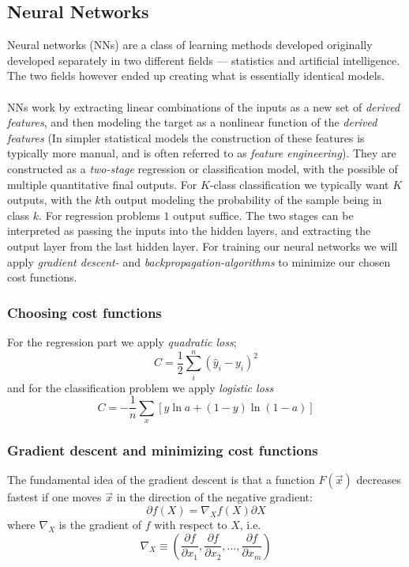 \documentclass[10pt, a4paper, twocolumn]{article}
\begin{document}
	\subsection{Neural Networks}
		Neural networks (NNs) are a class of learning methods developed originally developed separately in two different fields --- statistics and artificial intelligence. The two fields however ended up creating what is essentially identical models\cite{ElementsOfStatLearning}.\\\\
		NNs work by extracting linear combinations of the inputs as a new set of \emph{derived features}, and then modeling the target as a nonlinear function of the \emph{derived features} (In simpler statistical models the construction of these features is typically more manual, and is often referred to as \emph{feature engineering}). They are constructed as a \emph{two-stage} regression or classification model, with the possible of multiple quantitative final outputs. For $K$-class classification we typically want $K$ outputs, with the $k$th output modeling the probability of the sample being in class $k$. For regression problems $1$ output suffice. The two stages can be interpreted as passing the inputs into the hidden layers, and extracting the output layer from the last hidden layer.
		For training our neural networks we will apply \emph{gradient descent-} and \emph{backpropagation-algorithms} to minimize our chosen cost functions. 
		\subsubsection{Choosing cost functions}
			For the regression part we apply \emph{quadratic loss}; 
				$$C = \frac{1}{2}\sum_i^n\left(\hat{y}_i-y_i\right)^2$$
			and for the classification problem we apply \emph{logistic loss}
				$$C = -\frac{1}{n} \sum_x \left[y \ln a + (1-y ) \ln (1-a) \right]$$
		\subsubsection{Gradient descent and minimizing cost functions}
			The fundamental idea of the gradient descent is that a function $F(\vec{x})$ decreases fastest if one moves $\vec{x}$ in the direction of the negative gradient:
				$$\partial f(X)=\nabla_X f(X)\partial X$$
			where $\nabla_X$ is the gradient of $f$ with respect to $X$, i.e.
				$$\nabla_X\equiv \left(\frac{\partial f}{\partial x_1},\frac{\partial f}{\partial x_2},\dots,\frac{\partial f}{\partial x_m}\right)$$
			
\end{document}
